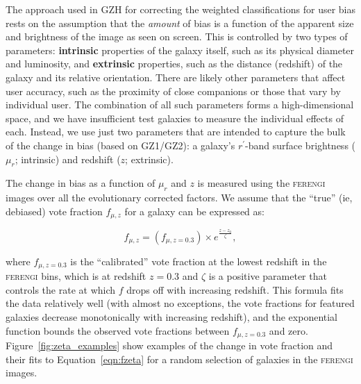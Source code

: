 \documentclass[usenatbib]{mn2e}
\newcommand{\ferengi}{\textsc{ferengi}}
\begin{document}
The approach used in GZH for correcting the weighted classifications for user bias rests on the assumption that the \emph{amount} of bias is a function of the apparent size and brightness of the image as seen on screen. This is controlled by two types of parameters: \textbf{intrinsic} properties of the galaxy itself, such as its physical diameter and luminosity, and \textbf{extrinsic} properties, such as the distance (redshift) of the galaxy and its relative orientation. There are likely other parameters that affect user accuracy, such as the proximity of close companions \citep[``distraction bias''; see][]{joh15} or those that vary by individual user. The combination of all such parameters forms a high-dimensional space, and we have insufficient test galaxies to measure the individual effects of each. Instead, we use just two parameters that are intended to capture the bulk of the change in bias (based on GZ1/GZ2): a galaxy's $r^\prime$-band surface brightness ($\mu_r$; intrinsic) and redshift ($z$; extrinsic). 

The change in bias as a function of $\mu_r$ and $z$ is measured using the \ferengi{} images over all the evolutionary corrected factors. We assume that the ``true'' (ie, debiased) vote fraction $f_{\mu,z}$ for a galaxy can be expressed as:

\begin{equation}
f_{\mu,z} = \left(f_{\mu,z=0.3}\right) \times e^{{\frac{z-z_0}{\zeta}}},
\label{eqn:fzeta}
\end{equation}

\noindent where $f_{\mu,z=0.3}$ is the ``calibrated'' vote fraction at the lowest redshift in the \ferengi{} bins, which is at redshift $z=0.3$ and $\zeta$ is a positive parameter that controls the rate at which $f$ drops off with increasing redshift. This formula fits the data relatively well (with almost no exceptions, the vote fractions for featured galaxies decrease monotonically with increasing redshift), and the exponential function bounds the observed vote fractions between $f_{\mu,z=0.3}$ and zero. Figure~\ref{fig:zeta_examples} show examples of the change in vote fraction and their fits to Equation~\ref{eqn:fzeta} for a random selection of galaxies in the \ferengi{} images. 
\end{document}
